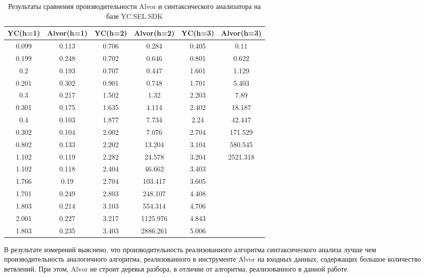 \begin{table} [htbp]
  \centering
  \parbox{14cm}{\caption{Результаты сравнения производительности Alvor и синтаксического анализатора на базе YC.SEL.SDK}\label{tbl:YCvsAlvor}}
  \begin{tabular}{| c | c | c | c | c | c |}
  \hline                               
  \hline
  YC(h=1) & Alvor(h=1) & YC(h=2) & Alvor(h=2) & YC(h=3) & Alvor(h=3)\\
  \hline 
0.099 &  0.113 &  0.706 &  0.284   & 0.405 &  0.11     \\
0.199 &  0.248 &  0.702 &  0.646   & 0.801 &  0.622    \\
0.2   &  0.193 &  0.707 &  0.447   & 1.601 &  1.129    \\
0.201 &  0.302 &  0.901 &  0.748   & 1.701 &  5.403    \\
0.3   &  0.217 &  1.502 &  1.32    & 2.203 &  7.89     \\
0.301 &  0.175 &  1.635 &  4.114   & 2.402 &  18.187   \\
0.4   &  0.103 &  1.877 &  7.734   & 2.24  &  42.447   \\
0.302 &  0.104 &  2.002 &  7.076   & 2.704 &  171.529  \\
0.802 &  0.133 &  2.202 &  13.204  & 3.104 &  580.545  \\
1.102 &  0.119 &  2.282 &  24.578  & 3.204 &  2521.318 \\
1.102 &  0.118 &  2.404 &  46.662  & 3.403 &           \\
1.766 &  0.19  &  2.704 &  103.417 & 3.605 &           \\
1.701 &  0.249 &  2.803 &  248.107 & 4.408 &           \\
1.803 &  0.214 &  3.103 &  554.314 & 4.706 &           \\
2.001 &  0.227 &  3.217 &  1125.976& 4.843 &           \\
1.803 &  0.235 &  3.403 &  2886.261& 5.006 &           \\
  \hline
  \hline

  \end{tabular}
\end{table}

В результате измерений выяснено, что производительность реализованного алгоритма синтаксического анализа лучше чем производительность аналогичного алгоритма, реализованного в инструменте Alvor на входных данных, содержащих большое количество ветвлений. При этом, Alvor не строит деревья разбора, в отличии от алгоритма, реализованного в данной работе.

